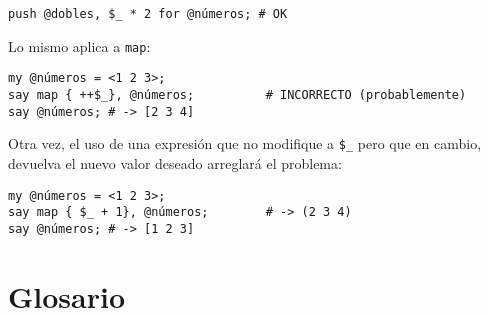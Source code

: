 \begin{enumerate}
\begin{lstlisting}
push @dobles, $_ * 2 for @números; # OK
\end{lstlisting}

Lo mismo aplica a {\tt map}:

\begin{lstlisting}
my @números = <1 2 3>;
say map { ++$_}, @números;          # INCORRECTO (probablemente)
say @números; # -> [2 3 4]
\end{lstlisting}
%

Otra vez, el uso de una expresión que no modifique a \verb|$_|
pero que en cambio, devuelva el nuevo valor deseado arreglará
el problema:

\begin{lstlisting}
my @números = <1 2 3>;
say map { $_ + 1}, @números;        # -> (2 3 4)
say @números; # -> [1 2 3]
\end{lstlisting}
%

\end{enumerate}



\section{Glosario}

